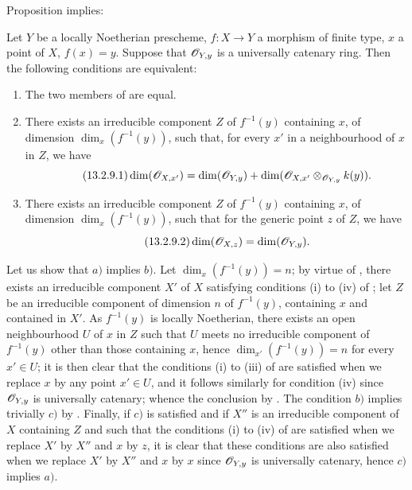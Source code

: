 Proposition  implies:

\begin{corollary}[13.2.9]
\label{IV.13.2.9}
Let $Y$ be a locally Noetherian prescheme, $f:X\to Y$ a morphism of finite type, $x$ a point of $X$, $f(x)=y$.
Suppose that $\mathscr{O}_{Y,y}$ is a universally catenary ring.
Then the following conditions are equivalent:
\begin{enumerate}[label=\emph{\alph*)}]
  \item The two members of  are equal.
  \item There exists an irreducible component $Z$ of $f^{-1}(y)$ containing $x$, of dimension $\dim_x(f^{-1}(y))$, such that, for every $x'$ in a neighbourhood of $x$ in $Z$, we have
  \[
  \label{IV.13.2.9.1}
\tag{13.2.9.1}
    \dim(\mathscr{O}_{X,x'})=\dim(\mathscr{O}_{Y,y})+\dim(\mathscr{O}_{X,x'}\otimes_{\mathscr{O}_{Y,y}}k(y)).
  \]
  \item There exists an irreducible component $Z$ of $f^{-1}(y)$ containing $x$, of dimension $\dim_x(f^{-1}(y))$, such that for the generic point $z$ of $Z$, we have
  \[
  \label{IV.13.2.9.2}
\tag{13.2.9.2}
    \dim(\mathscr{O}_{X,z})=\dim(\mathscr{O}_{Y,y}).
  \]
\end{enumerate}
\end{corollary}

Let us show that $a)$ implies $b)$.
Let $\dim_x(f^{-1}(y))=n$; by virtue of , there exists an irreducible component $X'$ of $X$ satisfying conditions (i) to (iv) of ; let $Z$ be an irreducible component of dimension $n$ of $f^{-1}(y)$, containing $x$ and contained in $X'$.
As $f^{-1}(y)$ is locally Noetherian, there exists an open neighbourhood $U$ of $x$ in $Z$ such that $U$ meets no irreducible component of $f^{-1}(y)$ other than those containing $x$, hence  $\dim_{x'}(f^{-1}(y))=n$ for every $x'\in U$; it is then clear that the conditions (i) to (iii) of  are satisfied when we replace $x$ by any point $x'\in U$, and it follows similarly for condition (iv) since $\mathscr{O}_{Y,y}$ is universally catenary; whence the conclusion by .
The condition $b)$ implies trivially $c)$ by .
Finally, if $c)$ is satisfied and if $X''$ is an irreducible component of $X$ containing $Z$ and such that the conditions (i) to (iv) of  are satisfied when we replace $X'$ by $X''$ and $x$ by $z$, it is clear that these conditions are also satisfied when we replace $X'$ by $X''$ and $x$ by $x$ since $\mathscr{O}_{Y,y}$ is universally catenary, hence $c)$ implies $a)$.

